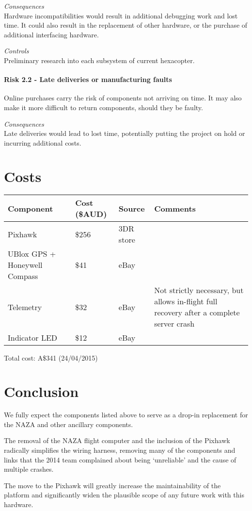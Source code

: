 \documentclass[a4paper, 11pt, titlepage]{article}
\begin{document}
\textit{Consequences}\\
Hardware incompatibilities would result in additional debugging work and lost time. It could also result in the replacement of other hardware, or the purchase of additional interfacing hardware.

\textit{Controls}\\
Preliminary research into each subsystem of current hexacopter.

\paragraph{Risk 2.2 - Late deliveries or manufacturing faults}
Online purchases carry the risk of components not arriving on time. It may also make it more difficult to return components, should they be faulty. 

\textit{Consequences}\\
Late deliveries would lead to lost time, potentially putting the project on hold or incurring additional costs.

\section{Costs}
\begin{tabularx}{\textwidth}{XllX}
	\hline
    \textbf{Component} & \textbf{Cost (\$AUD)} & \textbf{Source} & \textbf{Comments} \\
    \hline
    Pixhawk & \$256 & 3DR store &  \\
    UBlox GPS + Honeywell Compass & \$41 & eBay  &  \\
    Telemetry & \$32 & eBay  & Not strictly necessary, but allows in-flight full recovery after a complete server crash \\
    Indicator LED & \$12 & eBay  &  \\
    \hline
\end{tabularx}

Total cost: A\$341 (24/04/2015)

 \section{Conclusion}
 We fully expect the components listed above to serve as a drop-in replacement for the NAZA and other ancillary components.

The removal of the NAZA flight computer and the inclusion of the Pixhawk radically simplifies the wiring harness, removing many of the components and links that the 2014 team complained about being ‘unreliable’ and the cause of multiple crashes.

The move to the Pixhawk will greatly increase the maintainability of the platform and significantly widen the plausible scope of any future work with this hardware.

 

\renewcommand{\refname}{References}
\singlespacing


%

\end{document}
